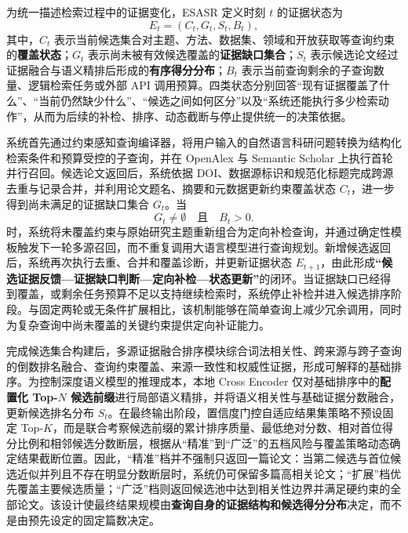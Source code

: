 \documentclass[a4paper,12pt,fontset=none]{ctexart}
\begin{document}
为统一描述检索过程中的证据变化，ESASR 定义时刻 $t$ 的证据状态为
\begin{equation}
	E_t=(C_t,G_t,S_t,B_t),
\end{equation}
其中，$C_t$ 表示当前候选集合对主题、方法、数据集、领域和开放获取等查询约束的\textbf{覆盖状态}；$G_t$ 表示尚未被有效候选覆盖的\textbf{证据缺口集合}；$S_t$ 表示候选论文经过证据融合与语义精排后形成的\textbf{有序得分分布}；$B_t$ 表示当前查询剩余的子查询数量、逻辑检索任务或外部 API 调用预算。四类状态分别回答``现有证据覆盖了什么''、``当前仍然缺少什么''、``候选之间如何区分''以及``系统还能执行多少检索动作''，从而为后续的补检、排序、动态截断与停止提供统一的决策依据。

系统首先通过约束感知查询编译器，将用户输入的自然语言科研问题转换为结构化检索条件和预算受控的子查询，并在 OpenAlex 与 Semantic Scholar 上执行首轮并行召回。候选论文返回后，系统依据 DOI、数据源标识和规范化标题完成跨源去重与记录合并，并利用论文题名、摘要和元数据更新约束覆盖状态 $C_t$，进一步得到尚未满足的证据缺口集合 $G_t$。当
\begin{equation}
	G_t\neq\emptyset
	\quad \text{且} \quad
	B_t>0.
\end{equation}
时，系统将未覆盖约束与原始研究主题重新组合为定向补检查询，并通过确定性模板触发下一轮多源召回，而不重复调用大语言模型进行查询规划。新增候选返回后，系统再次执行去重、合并和覆盖诊断，并更新证据状态 $E_{t+1}$，由此形成\textbf{``候选证据反馈—证据缺口判断—定向补检—状态更新''}的闭环。当证据缺口已经得到覆盖，或剩余任务预算不足以支持继续检索时，系统停止补检并进入候选排序阶段。与固定两轮或无条件扩展相比，该机制能够在简单查询上减少冗余调用，同时为复杂查询中尚未覆盖的关键约束提供定向补证能力。

完成候选集合构建后，多源证据融合排序模块综合词法相关性、跨来源与跨子查询的倒数排名融合、查询约束覆盖、来源一致性和权威性证据，形成可解释的基础排序。为控制深度语义模型的推理成本，本地 Cross Encoder 仅对基础排序中的\textbf{配置化 Top-$N$ 候选前缀}进行局部语义精排，并将语义相关性与基础证据分数融合，更新候选排名分布 $S_t$。在最终输出阶段，置信度门控自适应结果集策略不预设固定 Top-$K$，而是联合考察候选前缀的累计排序质量、最低绝对分数、相对首位得分比例和相邻候选分数断层，根据从``精准''到``广泛''的五档风险与覆盖策略动态确定结果截断位置。因此，``精准''档并不强制只返回一篇论文：当第二候选与首位候选近似并列且不存在明显分数断层时，系统仍可保留多篇高相关论文；``扩展''档优先覆盖主要候选质量；``广泛''档则返回候选池中达到相关性边界并满足硬约束的全部论文。该设计使最终结果规模由\textbf{查询自身的证据结构和候选得分分布}决定，而不是由预先设定的固定篇数决定。
\end{document}
